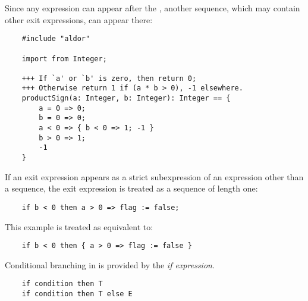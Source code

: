 Since any expression can appear after the \ttin{=>}, another sequence,
which may contain other exit expressions, can appear there:

\begin{small}
\begin{verbatim}
    #include "aldor"

    import from Integer;

    +++ If `a' or `b' is zero, then return 0;
    +++ Otherwise return 1 if (a * b > 0), -1 elsewhere.
    productSign(a: Integer, b: Integer): Integer == {
        a = 0 => 0;
        b = 0 => 0;
        a < 0 => { b < 0 => 1; -1 }
        b > 0 => 1;
        -1 
    }
\end{verbatim}
\end{small}

If an exit expression appears as a strict subexpression of an expression
other than a sequence, the exit expression is treated as a sequence
of length one:

\begin{small}
\begin{verbatim}
    if b < 0 then a > 0 => flag := false;
\end{verbatim}
\end{small}

This example is treated as equivalent to:

\begin{small}
\begin{verbatim}
    if b < 0 then { a > 0 => flag := false }
\end{verbatim}
\end{small}




Conditional branching in \asharp{} is provided by the {\em if expression\/}.

\begin{small}
\begin{verbatim}
    if condition then T
    if condition then T else E
\end{verbatim}
\end{small}

